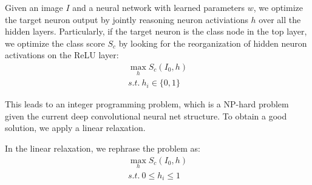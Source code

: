 Given an image $I$ and a neural network with learned parameters $w$, we optimize the target neuron output by jointly reasoning neuron activiations $h$ over all the hidden layers. Particularly, if the target neuron is the class node in the top layer, we optimize the class score $S_c$ by looking for the reorganization of hidden neuron activations on the ReLU layer:
\begin{equation}
\begin{aligned}
  \max_h S_c(I_0, h) \\
  s.t.\ h_i \in \{0, 1\}
\end{aligned}
\end{equation}

This leads to an integer programming problem, which is a NP-hard problem given the current deep convolutional neural net structure. To obtain a good solution, we apply a linear relaxation.

In the linear relaxation, we rephrase the problem as:
\begin{equation}
\begin{aligned}
  \max_h S_c(I_0, h) \\
  s.t.\ 0 \leq h_i \leq 1
\end{aligned}
\end{equation}

